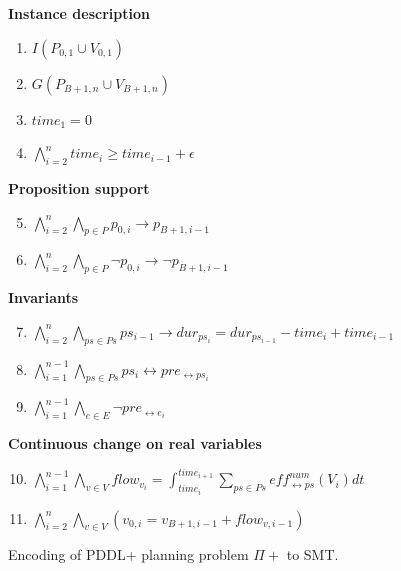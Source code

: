\begin{figure}[thb]
\begin{minipage}[t]{0.39\linewidth}
\textbf{Instance description}
\begin{enumerate}[label=P\arabic*.]
  \item $I(P_{0,1}\cup V_{0,1})$
  \item $G(P_{B+1,n}\cup V_{B+1,n})$
  \item $time_1 = 0$
  \item $\bigwedge_{i=2}^n time_i \geq time_{i-1}+\epsilon$
\end{enumerate}
\textbf{Proposition support}
\begin{enumerate}[label=P\arabic*.]\setcounter{enumi}{4}
  \item $\bigwedge_{i=2}^n \bigwedge_{p\in P} p_{0,i} \rightarrow p_{B+1,i-1}$
  \item $\bigwedge_{i=2}^n \bigwedge_{p\in P} \neg p_{0,i} \rightarrow \neg p_{B+1,i-1}$
\end{enumerate}
\end{minipage}
\begin{minipage}[t]{0.6\linewidth}
\textbf{Invariants}
\begin{enumerate}[label=P\arabic*.]\setcounter{enumi}{6}
  \item $\bigwedge_{i=2}^n \bigwedge_{ps\in Ps} ps_{i-1} \rightarrow dur_{ps_i} = dur_{ps_{i-1}} - time_i + time_{i-1}$
  \item $\bigwedge_{i=1}^{n-1} \bigwedge_{ps \in Ps}  ps_i \leftrightarrow pre_{\leftrightarrow ps_i}$
  \item $\bigwedge_{i=1}^{n-1} \bigwedge_{e\in E} \neg pre_{\leftrightarrow e_i}$
\end{enumerate}
\textbf{Continuous change on real variables}
\begin{enumerate}[label=P\arabic*.]\setcounter{enumi}{9}
  \item $\bigwedge_{i=1}^{n-1} \bigwedge_{v\in V} flow_{v_i} = \int^{time_{i+1}}_{time_i} \sum_{ps\in Ps} eff^{num}_{\leftrightarrow ps}(V_i)dt$
  \item $\bigwedge_{i=2}^n \bigwedge_{v\in V} (v_{0,i} = v_{B+1,i-1} + flow_{v,i-1})$
\end{enumerate}
\end{minipage}
\caption{Encoding of PDDL+ planning problem $\Pi+$ to SMT.}
\label{eq:plan}
\end{figure}

